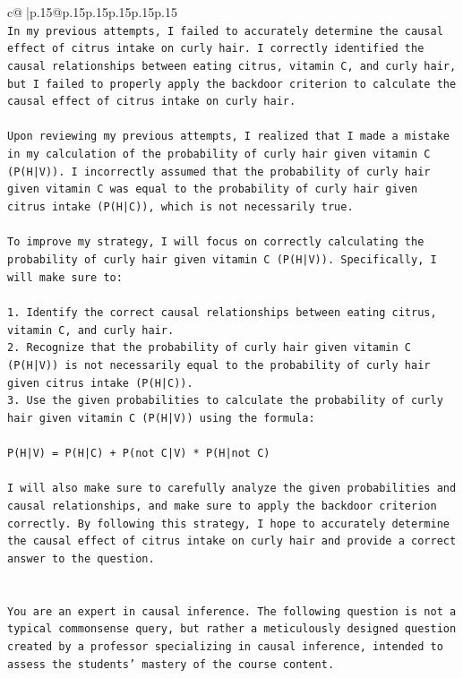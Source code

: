 \documentclass{article}
\begin{document}
{\begin{supertabular}{c@{$\;$}|p{.15\linewidth}@{}p{.15\linewidth}p{.15\linewidth}p{.15\linewidth}p{.15\linewidth}p{.15\linewidth}}
{{{\\ 
\texttt{In my previous attempts, I failed to accurately determine the causal effect of citrus intake on curly hair. I correctly identified the causal relationships between eating citrus, vitamin C, and curly hair, but I failed to properly apply the backdoor criterion to calculate the causal effect of citrus intake on curly hair.} \\
\\ 
\texttt{Upon reviewing my previous attempts, I realized that I made a mistake in my calculation of the probability of curly hair given vitamin C (P(H|V)). I incorrectly assumed that the probability of curly hair given vitamin C was equal to the probability of curly hair given citrus intake (P(H|C)), which is not necessarily true.} \\
\\ 
\texttt{To improve my strategy, I will focus on correctly calculating the probability of curly hair given vitamin C (P(H|V)). Specifically, I will make sure to:} \\
\\ 
\texttt{1. Identify the correct causal relationships between eating citrus, vitamin C, and curly hair.} \\
\texttt{2. Recognize that the probability of curly hair given vitamin C (P(H|V)) is not necessarily equal to the probability of curly hair given citrus intake (P(H|C)).} \\
\texttt{3. Use the given probabilities to calculate the probability of curly hair given vitamin C (P(H|V)) using the formula:} \\
\\ 
\texttt{P(H|V) = P(H|C) + P(not C|V) * P(H|not C)} \\
\\ 
\texttt{I will also make sure to carefully analyze the given probabilities and causal relationships, and make sure to apply the backdoor criterion correctly. By following this strategy, I hope to accurately determine the causal effect of citrus intake on curly hair and provide a correct answer to the question.} \\
\\ 
\\ 
\texttt{You are an expert in causal inference. The following question is not a typical commonsense query, but rather a meticulously designed question created by a professor specializing in causal inference, intended to assess the students' mastery of the course content.} \\
}}}
\end{supertabular}}
\end{document}
